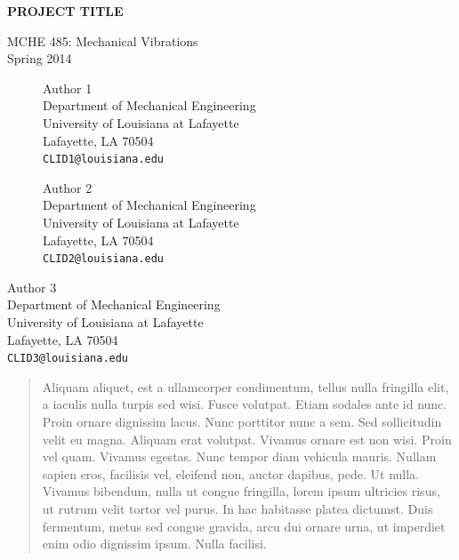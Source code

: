 \documentclass[11pt]{article}
\begin{document}
\thispagestyle{empty}
\begin{center}
\vspace*{1.5in}
{\LARGE \textbf{PROJECT TITLE}} %

{\Large MCHE 485: Mechanical Vibrations\\ \vspace*{0.1in} Spring 2014}

\vspace*{2.5in}

\begin{figure}[!h]
\begin{minipage}{0.45\textwidth}
\begin{center}
Author 1 \\
Department of Mechanical Engineering\\
University of Louisiana at Lafayette\\
Lafayette, LA 70504\\
{\tt CLID1@louisiana.edu}
\end{center}
\end{minipage}
\hspace{0.08\textwidth}
\begin{minipage}{0.45\textwidth}
\begin{center}
Author 2 \\
Department of Mechanical Engineering\\
University of Louisiana at Lafayette\\
Lafayette, LA 70504\\
\tt{CLID2@louisiana.edu}
\end{center}
\end{minipage}
\end{figure}

\vspace{0.2in}

Author 3 \\
Department of Mechanical Engineering\\
University of Louisiana at Lafayette\\
Lafayette, LA 70504\\
\tt{CLID3@louisiana.edu}

\end{center}

\newpage
\thispagestyle{empty}
\begin{abstract}
\vspace{-0.2in}
Aliquam aliquet, est a ullamcorper condimentum, tellus nulla fringilla elit, a iaculis nulla turpis sed wisi. Fusce volutpat. Etiam sodales ante id nunc. Proin ornare dignissim lacus. Nunc porttitor nunc a sem. Sed sollicitudin velit eu magna. Aliquam erat volutpat. Vivamus ornare est non wisi. Proin vel quam. Vivamus egestas. Nunc tempor diam vehicula mauris. Nullam sapien eros, facilisis vel, eleifend non, auctor dapibus, pede. Ut nulla. Vivamus bibendum, nulla ut congue fringilla, lorem ipsum ultricies risus, ut rutrum velit tortor vel purus. In hac habitasse platea dictumst. Duis fermentum, metus sed congue gravida, arcu dui ornare urna, ut imperdiet enim odio dignissim ipsum. Nulla facilisi. 
\end{abstract} 
\end{document}
